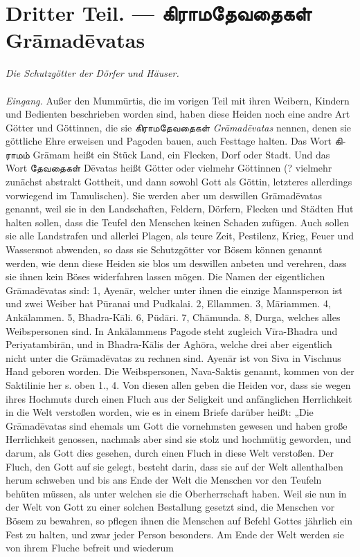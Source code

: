 \documentclass{article}
\newcommand{\TamilText}[1]{\texttamil{#1}}
\newcommand{\TamilBold}[1]{\texttamil{\textbf{#1}}}
\newcommand{\tam}[1]{\TamilText{#1}}
\newcommand{\tambold}[1]{\TamilBold{#1}}
\begin{document}
\clearpage
\section{\textgerman{Dritter Teil. —} \tambold{கிராமதேவதைகள்} \textgerman{Gr\={a}mad\={e}vatas}}
\begin{center}
\emph{Die Schutzgötter der Dörfer und Häuser.}
\end{center}
\paragraph{}
\emph{Eingang.} Außer den Mumm\={u}rtis, die im vorigen Teil mit ihren Weibern, Kindern und Bedienten beschrieben worden sind, haben diese Heiden noch eine andre Art Götter und Göttinnen, die sie \tam{கிராமதேவதைகள்} \emph{Gr\={a}mad\={e}vatas} nennen, denen sie göttliche Ehre erweisen und Pagoden bauen, auch Festtage halten. Das Wort \tam{கிராமம்} Gr\={a}mam heißt ein Stück Land, ein Flecken, Dorf oder Stadt. Und das Wort \tam{தேவதைகள்} D\={e}vatas heißt Götter oder vielmehr Göttinnen (? vielmehr zunächst abstrakt Gottheit, und dann sowohl Gott als Göttin, letzteres allerdings vorwiegend im Tamulischen). Sie werden aber um deswillen Gr\={a}mad\={e}vatas genannt, weil sie in den Landschaften, Feldern, Dörfern, Flecken und Städten Hut halten sollen, dass die Teufel den Menschen keinen Schaden zufügen. Auch sollen sie alle Landstrafen und allerlei Plagen, als teure Zeit, Pestilenz, Krieg, Feuer und Wassersnot abwenden, so dass sie Schutzgötter vor Bösem können genannt werden, wie denn diese Heiden sie blos um deswillen anbeten und verehren, dass sie ihnen kein Böses widerfahren lassen mögen. Die Namen der eigentlichen Gr\={a}mad\={e}vatas sind: 1, Ayen\={a}r, welcher unter ihnen die einzige Mannsperson ist und zwei Weiber hat P\={u}ranai und Pudkalai. 2, Ellammen. 3, M\={a}riammen. 4, Ank\={a}lammen. 5, Bhadra-K\={a}li. 6, Püd\={a}ri. 7, Ch\={a}munda. 8, Durga, welches alles Weibspersonen sind. In Ank\={a}lammens Pagode steht zugleich V\={i}ra-Bhadra und Periyatambir\={a}n, und in Bhadra-K\={a}lis der Agh\={o}ra, welche drei aber eigentlich nicht unter die Gr\={a}mad\={e}vatas zu rechnen sind. Ayen\={a}r ist von Siva in Vischnus Hand geboren worden. Die Weibspersonen, Nava-Saktis genannt, kommen von der Saktilinie her s. oben 1., 4. Von diesen allen geben die Heiden vor, dass sie wegen ihres Hochmuts durch einen Fluch aus der Seligkeit und anfänglichen Herrlichkeit in die Welt verstoßen worden, wie es in einem Briefe darüber heißt: „Die Gr\={a}mad\={e}vatas sind ehemals um Gott die vornehmsten gewesen und haben große Herrlichkeit genossen, nachmals aber sind sie stolz und hochmütig geworden, und darum, als Gott dies gesehen, durch einen Fluch in diese Welt verstoßen. Der Fluch, den Gott auf sie gelegt, besteht darin, dass sie auf der Welt allenthalben herum schweben und bis ans Ende der Welt die Menschen vor den Teufeln behüten müssen, als unter welchen sie die Oberherrschaft haben. Weil sie nun in der Welt von Gott zu einer solchen Bestallung gesetzt sind, die Menschen vor Bösem zu bewahren, so pflegen ihnen die Menschen auf Befehl Gottes jährlich ein Fest zu halten, und zwar jeder Person besonders. Am Ende der Welt werden sie von ihrem Fluche befreit und wiederum 
\end{document}
